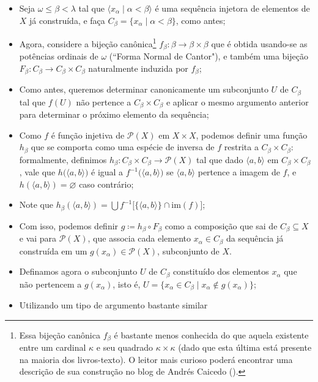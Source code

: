 \documentclass{hipatia}
\newcommand{\partes}[1]{\mathcal{P}(#1)}
\newcommand{\subs}{\subseteq}
\begin{document}
\begin{itemize}[leftmargin=*]%
\item Seja $\omega\leq\beta<\lambda$ tal que $\langle
x_\alpha\mid\alpha<\beta\rangle$ é uma sequência
injetora de elementos de $X$ já construída, e faça
$C_\beta=\{x_\alpha\mid\alpha<\beta\}$, como antes;
\item Agora, considere a bijeção canônica\footnote{Essa
bijeção canônica $f_\beta$ é bastante menos conhecida
do que aquela existente entre um cardinal $\kappa$ e
seu quadrado $\kappa \times \kappa$ (dado que esta
última está presente na maioria dos livros-texto). O
leitor mais curioso poderá encontrar uma descrição de
sua construção no blog de Andrés Caicedo
(\cite{Caicedo}).}
$f_\beta\colon\beta\rightarrow\beta\times\beta$ que é
obtida usando-se as potências ordinais de $\omega$
(``Forma Normal de Cantor"), e também uma bijeção
$F_\beta\colon C_\beta\rightarrow C_\beta\times C_\beta$
naturalmente induzida por $f_\beta$; \item Como antes,
queremos determinar canonicamente um subconjunto $U$
de $C_\beta$ tal que $f(U)$ não pertence a
$C_\beta\times C_\beta$ e aplicar o mesmo argumento
anterior para determinar o próximo elemento da
sequência; \item Como $f$ é função injetiva de
$\partes{X}$ em $X\times X$, podemos definir uma
função $h_\beta$ que se comporta como uma espécie
de inversa de $f$ restrita a $C_\beta\times
C_\beta$: formalmente, definimos
$h_\beta\colon C_\beta\times
C_\beta\rightarrow\partes{X}$ tal que dado
$\langle a,b\rangle$ em $C_\beta\times C_\beta$,
vale que $h\big(\langle a,b\rangle\big)$ é igual a
$f^{-1}\big(\langle a,b\rangle\big)$ se $\langle
a,b\rangle$ pertence a imagem de $f$, e $h(\langle
a,b\rangle)=\varnothing$ caso contrário; \item
Note que $h_\beta(\langle a,b\rangle)=\bigcup
f^{-1}\big[\{\langle
a,b\rangle\}\cap\text{im}(f)\big]$; \item Com isso,
podemos definir $g\coloneq h_\beta\circ
F_\beta$ como a composição que sai de $C_\beta\subs X$ e vai para
$\partes{X}$, que associa cada elemento $x_\alpha\in
C_\beta$ da sequência já construída em um
$g(x_\alpha)\in\partes{X}$, subconjunto de $X$.
\item Definamos agora o subconjunto $U$ de $C_\beta$
constituído dos elementos $x_\alpha$ que não
pertencem a $g(x_\alpha)$, isto é, $U=\{x_\alpha\in
C_\beta\mid x_\alpha\notin g(x_\alpha)\}$; \item
Utilizando um tipo de argumento bastante similar

\end{itemize}
\end{document}
